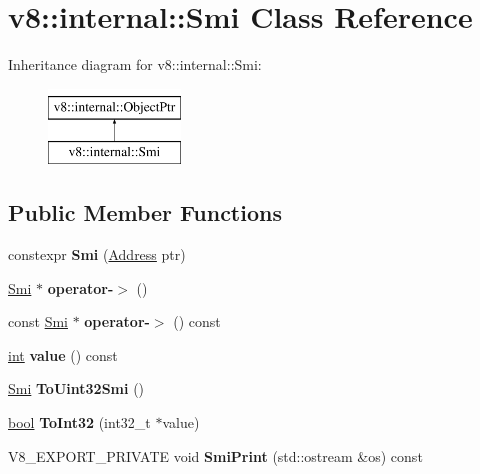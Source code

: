 \hypertarget{classv8_1_1internal_1_1Smi}{}\section{v8\+:\+:internal\+:\+:Smi Class Reference}
\label{classv8_1_1internal_1_1Smi}
Inheritance diagram for v8\+:\+:internal\+:\+:Smi\+:\begin{figure}[H]
\begin{center}
\leavevmode
\includegraphics[height=2.000000cm]{classv8_1_1internal_1_1Smi}
\end{center}
\end{figure}
\subsection*{Public Member Functions}
\begin{DoxyCompactItemize}
\item 
\mbox{\label{classv8_1_1internal_1_1Smi_a8ae203265680600af65a6819e29ce5c3}} 
constexpr {\bfseries Smi} (\mbox{\hyperlink{classuintptr__t}{Address}} ptr)
\item 
\mbox{\label{classv8_1_1internal_1_1Smi_aead0552da30752c55acd0dd12514ce98}} 
\mbox{\hyperlink{classv8_1_1internal_1_1Smi}{Smi}} $\ast$ {\bfseries operator-\/$>$} ()
\item 
\mbox{\label{classv8_1_1internal_1_1Smi_a97e38815ba2cd6c0d4b3e91c4af99af7}} 
const \mbox{\hyperlink{classv8_1_1internal_1_1Smi}{Smi}} $\ast$ {\bfseries operator-\/$>$} () const
\item 
\mbox{\label{classv8_1_1internal_1_1Smi_a8592eb7ac53938b4cb84ac7a89271e22}} 
\mbox{\hyperlink{classint}{int}} {\bfseries value} () const
\item 
\mbox{\label{classv8_1_1internal_1_1Smi_a1c2740da44a66fa1cb2a01291e4be366}} 
\mbox{\hyperlink{classv8_1_1internal_1_1Smi}{Smi}} {\bfseries To\+Uint32\+Smi} ()
\item 
\mbox{\label{classv8_1_1internal_1_1Smi_ae1a3bb7a4a794f10b72e42458d675bd7}} 
\mbox{\hyperlink{classbool}{bool}} {\bfseries To\+Int32} (int32\+\_\+t $\ast$value)
\item 
\mbox{\label{classv8_1_1internal_1_1Smi_a499119e41054bc5bb2ed8b06a5c61dfa}} 
V8\+\_\+\+E\+X\+P\+O\+R\+T\+\_\+\+P\+R\+I\+V\+A\+TE void {\bfseries Smi\+Print} (std\+::ostream \&os) const
\end{DoxyCompactItemize}
